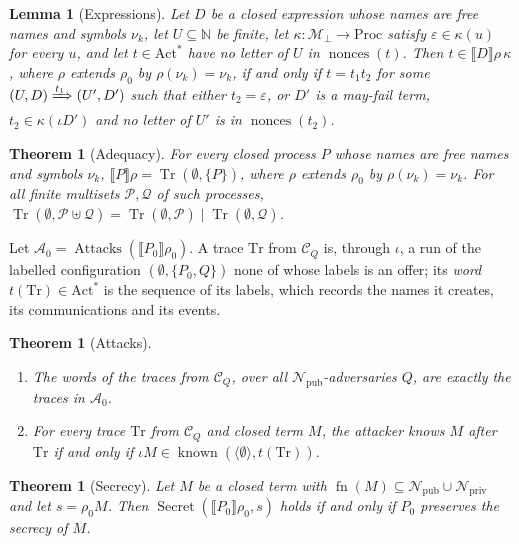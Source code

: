 \documentclass[11pt]{article}
\theoremstyle{definition}
\theoremstyle{plain}
\newtheorem{lemma}[definition]{Lemma}
\newtheorem{theorem}[definition]{Theorem}
\theoremstyle{remark}
\newcommand{\N}{\mathbb{N}}
\newcommand{\Act}{\mathrm{Act}}
\newcommand{\Proc}{\mathrm{Proc}}
\newcommand{\known}{\operatorname{known}}
\newcommand{\nonces}{\operatorname{nonces}}
\newcommand{\Attacks}{\operatorname{Attacks}}
\newcommand{\Secret}{\operatorname{Secret}}
\newcommand{\sem}[1]{\llbracket #1 \rrbracket}
\newcommand{\fn}{\operatorname{fn}}
\newcommand{\Tr}{\operatorname{Tr}}
\begin{document}
\begin{lemma}[Expressions]\label{lem:expr}
Let $D$ be a closed expression whose names are free names and symbols $\nu_k$, let $U\subseteq\N$ be finite, let $\kappa:\mathcal{M}_{\bot}\to\Proc$ satisfy $\varepsilon\in\kappa(u)$ for every $u$, and let $t\in\Act^*$ have no letter of $U$ in $\nonces(t)$. Then $t\in\sem{D}\rho\,\kappa$, where $\rho$ extends $\rho_0$ by $\rho(\nu_k)=\nu_k$, if and only if $t=t_1t_2$ for some $(U,D)\xRightarrow{t_1}(U',D')$ such that either $t_2=\varepsilon$, or $D'$ is a may-fail term, $t_2\in\kappa(\iota D')$ and no letter of $U'$ is in $\nonces(t_2)$.
\end{lemma}

\begin{theorem}[Adequacy]\label{thm:T}
For every closed process $P$ whose names are free names and symbols $\nu_k$, $\sem{P}\rho=\Tr(\emptyset,\{P\})$, where $\rho$ extends $\rho_0$ by $\rho(\nu_k)=\nu_k$. For all finite multisets $\mathcal{P},\mathcal{Q}$ of such processes, $\Tr(\emptyset,\mathcal{P}\uplus\mathcal{Q})=\Tr(\emptyset,\mathcal{P})\mid\Tr(\emptyset,\mathcal{Q})$.
\end{theorem}

Let $\mathcal{A}_0=\Attacks(\sem{P_0}\rho_0)$. A trace $\mathrm{Tr}$ from $\mathcal{C}_Q$ is, through $\iota$, a run of the labelled configuration $(\emptyset,\{P_0,Q\})$ none of whose labels is an offer; its \emph{word} $t(\mathrm{Tr})\in\Act^*$ is the sequence of its labels, which records the names it creates, its communications and its events.

\begin{theorem}[Attacks]\label{thm:A}
\begin{enumerate}
\item[(i)] The words of the traces from $\mathcal{C}_Q$, over all $\mathcal{N}_{\mathrm{pub}}$-adversaries $Q$, are exactly the traces in $\mathcal{A}_0$.
\item[(ii)] For every trace $\mathrm{Tr}$ from $\mathcal{C}_Q$ and closed term $M$, the attacker knows $M$ after $\mathrm{Tr}$ if and only if $\iota M\in\known(\langle\emptyset\rangle,t(\mathrm{Tr}))$.
\end{enumerate}
\end{theorem}

\begin{theorem}[Secrecy]\label{thm:secrecy}
Let $M$ be a closed term with $\fn(M)\subseteq\mathcal{N}_{\mathrm{pub}}\cup\mathcal{N}_{\mathrm{priv}}$ and let $s=\rho_0M$. Then $\Secret(\sem{P_0}\rho_0,s)$ holds if and only if $P_0$ preserves the secrecy of $M$.
\end{theorem}
\end{document}
